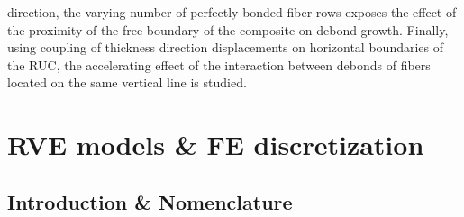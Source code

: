 \documentclass[review]{elsarticle}
\begin{document}
direction, the varying number of perfectly bonded fiber rows exposes the effect of the proximity of the free boundary of the composite on debond growth. Finally, using coupling of thickness direction displacements on horizontal boundaries of the RUC, the accelerating effect of the interaction between debonds of fibers located on the same vertical line is studied.

\section{RVE models \& FE discretization}

\subsection{Introduction \& Nomenclature}\label{subsec:names}
\end{document}
